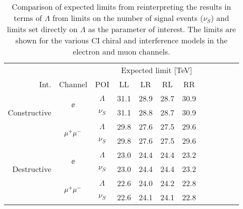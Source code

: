 \begin{table}[htp]
    \begin{center}  
{\begin{tabular}{r c c c c c c c c c c c}\toprule
    & & & \multicolumn{4}{c}{Expected limit [TeV]} \\
    Int. & Channel & POI & LL & LR & RL & RR \\
    \midrule
    \multirow{3}{*}[-1em]{\begin{sideways}Constructive\end{sideways}} & \multirow{2}{*}{$\ee$} & $\Lambda$ & 31.1 & 28.9 & 28.7 & 30.9 \\
    & & $\nu_S$ & 31.1 & 28.8 & 28.7 & 30.9 \\
    \cmidrule{2-7}
     & \multirow{2}{*}{$\mu^{+} \mu^{-}$} & $\Lambda$ & 29.8 & 27.6 & 27.5 & 29.6 \\
    & & $\nu_S$ & 29.8 & 27.6 & 27.5 & 29.6 \\
    \midrule
    \multirow{3}{*}[-1em]{\begin{sideways}Destructive\end{sideways}} & \multirow{2}{*}{$\ee$} & $\Lambda$ & 23.0 & 24.4 & 24.4 & 23.2 \\
    & & $\nu_S$ & 23.0 & 24.4 & 24.4 & 23.2 \\
    \cmidrule{2-7}
     & \multirow{2}{*}{$\mu^{+} \mu^{-}$} & $\Lambda$ & 22.6 & 24.0 & 24.2 & 22.8 \\
    & & $\nu_S$ & 22.6 & 24.1 & 24.1 & 22.8 \\
\bottomrule\end{tabular}}
\caption{Comparison of expected limits from reinterpreting the results in terms of $\Lambda$ from limits on the number of signal events ($\nu_S$) and limits set directly on $\Lambda$ as the parameter of interest. The limits are shown for the various CI chiral and interference models in the electron and muon channels.}  
\label{tab:limits_comparePOI}
\end{center}
\end{table}

\clearpage
